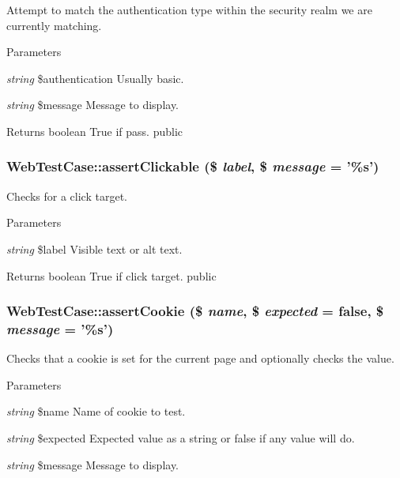 \label{class_web_test_case_a1cf868c95aec441290995d71aba42f0a}
Attempt to match the authentication type within the security realm we are currently matching. 
\begin{DoxyParams}{Parameters}
\item[{\em string}]\$authentication Usually basic. \item[{\em string}]\$message Message to display. \end{DoxyParams}
\begin{DoxyReturn}{Returns}
boolean True if pass.  public 
\end{DoxyReturn}
\hypertarget{class_web_test_case_ac2a2523df882dcad5f6191b9d6386d4a}{
\subsubsection[{assertClickable}]{\setlength{\rightskip}{0pt plus 5cm}WebTestCase::assertClickable (\$ {\em label}, \/  \$ {\em message} = {\ttfamily '\%s'})}}
\label{class_web_test_case_ac2a2523df882dcad5f6191b9d6386d4a}
Checks for a click target. 
\begin{DoxyParams}{Parameters}
\item[{\em string}]\$label Visible text or alt text. \end{DoxyParams}
\begin{DoxyReturn}{Returns}
boolean True if click target.  public 
\end{DoxyReturn}
\hypertarget{class_web_test_case_aabfb7913fcd6e94811a9029f848117e8}{
\subsubsection[{assertCookie}]{\setlength{\rightskip}{0pt plus 5cm}WebTestCase::assertCookie (\$ {\em name}, \/  \$ {\em expected} = {\ttfamily false}, \/  \$ {\em message} = {\ttfamily '\%s'})}}
\label{class_web_test_case_aabfb7913fcd6e94811a9029f848117e8}
Checks that a cookie is set for the current page and optionally checks the value. 
\begin{DoxyParams}{Parameters}
\item[{\em string}]\$name Name of cookie to test. \item[{\em string}]\$expected Expected value as a string or false if any value will do. \item[{\em string}]\$message Message to display. \end{DoxyParams}
